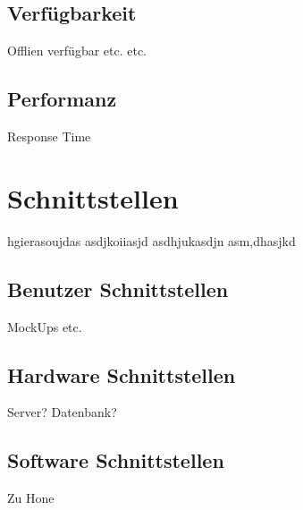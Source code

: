 	\subsection{Verfügbarkeit}
		Offlien verfügbar etc. etc.
		
	\subsection{Performanz}
		Response Time 
	
\section{Schnittstellen}
hgierasoujdas asdjkoiiasjd asdhjukasdjn asm,dhasjkd

	\subsection{Benutzer Schnittstellen}
		MockUps etc.
		
	\subsection{Hardware Schnittstellen}
		Server? Datenbank?		
		
	\subsection{Software Schnittstellen}
		Zu Hone
